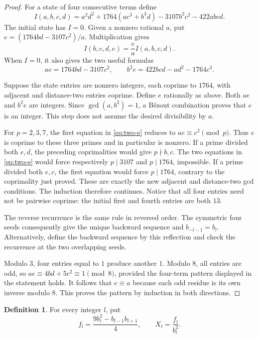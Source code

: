 \documentclass[11pt,a4paper]{article}
\theoremstyle{definition}
\newtheorem{definition}[theorem]{Definition}
\begin{document}
\begin{proof}
For a state of four consecutive terms define
\[
 I(a,b,c,d)=a^2d^2+1764(ac^3+b^3d)-3107b^2c^2-422abcd.
\]
The initial state has \(I=0\). Given a nonzero rational \(a\), put
\(e=(1764bd-3107c^2)/a\). Multiplication gives
\begin{equation}\label{eq:invariant}
 I(b,c,d,e)=\frac ea I(a,b,c,d).
\end{equation}
When \(I=0\), it also gives the two useful formulas
\begin{equation}\label{eq:two-e}
 ae=1764bd-3107c^2,\qquad
 b^2e=422bcd-ad^2-1764c^3.
\end{equation}

Suppose the state entries are nonzero integers, each coprime to
\(1764\), with adjacent and distance-two entries coprime. Define
\(e\) rationally as above. Both \(ae\) and \(b^2e\) are integers.
Since \(\gcd(a,b^2)=1\), a B\'ezout combination proves that \(e\)
is an integer. This step does not assume the desired divisibility
by \(a\).

For \(p=2,3,7\), the first equation in \eqref{eq:two-e} reduces to
\(ae\equiv c^2\pmod p\). Thus \(e\) is coprime to these three
primes and in particular is nonzero. If a prime divided both \(e,d\),
the preceding coprimalities would give \(p\nmid b,c\). The two
equations in \eqref{eq:two-e} would force respectively
\(p\mid3107\) and \(p\mid1764\), impossible. If a prime divided
both \(e,c\), the first equation would force \(p\mid1764\),
contrary to the coprimality just proved. These are exactly the new
adjacent and distance-two gcd conditions. The induction therefore
continues. Notice that all four entries need not be pairwise coprime:
the initial first and fourth entries are both \(13\).

The reverse recurrence is the same rule in reversed order. The
symmetric four seeds consequently give the unique backward sequence
and \(b_{-l-1}=b_l\). Alternatively, define the backward sequence by
this reflection and check the recurrence at the two overlapping seeds.

Modulo \(3\), four entries equal to \(1\) produce another \(1\).
Modulo \(8\), all entries are odd, so
\(ae\equiv4bd+5c^2\equiv1\pmod8\), provided the four-term pattern
displayed in the statement holds. It follows that \(e\equiv a\)
because each odd residue is its own inverse modulo \(8\). This
proves the pattern by induction in both directions.
\end{proof}

\begin{definition}\label{def:f}
For every integer \(l\), put
\[
 f_l=\frac{9b_l^2-b_{l-1}b_{l+1}}4,
 \qquad X_l=\frac{f_l}{b_l^2}.
\]
\end{definition}
\end{document}
